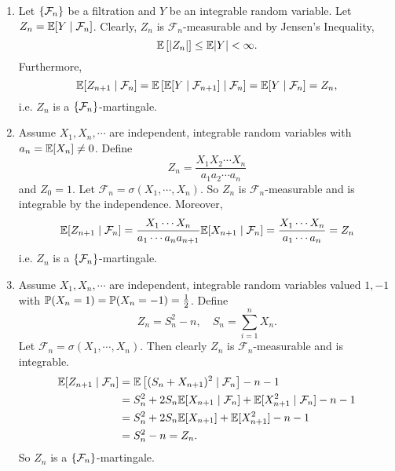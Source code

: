 \begin{exam}
    \begin{enumerate}[label=(\arabic{*})]
        \item Let $\left\{\mathcal{F}_n\right\}$ be a filtration and $Y$ be an integrable random variable. Let $Z_n = \mathbb{E}[Y \mid \mathcal{F}_n]$. Clearly, $Z_n$ is $\mathcal{F}_n$-measurable and by Jensen's Inequality,
        \begin{equation*}
            \mathbb{E}\left[\left\lvert Z_n\right\lvert\right] \leq \mathbb{E}{\left\lvert Y\right\lvert} < \infty.
        \end{equation*}
        Furthermore,
        \begin{equation*}
            \mathbb{E}[Z_{n+1} \mid \mathcal{F}_n] = \mathbb{E}\left[\mathbb{E}[Y \mid \mathcal{F}_{n+1}] \mid \mathcal{F}_n\right] = \mathbb{E}[Y \mid \mathcal{F}_n] = Z_n,
        \end{equation*}
        i.e. $Z_n$ is a $\left\{\mathcal{F}_n\right\}$-martingale.

        \item Assume $X_1,X_n,\cdots$ are independent, integrable random variables with $a_n = \mathbb{E}[X_n] \neq 0$. Define
        \begin{equation*}
            Z_n = \frac{X_1X_2\cdots X_n}{a_1a_2\cdots a_n}
        \end{equation*}
        and $Z_0 = 1$. Let $\mathcal{F}_n = \sigma(X_1,\cdots,X_n)$. So $Z_n$ is $\mathcal{F}_n$-measurable and is integrable by the independence. Moreover,
        \begin{equation*}
            \mathbb{E}[Z_{n+1} \mid \mathcal{F}_n] = \frac{X_1\cdots X_n}{a_1\cdots a_na_{n+1}}\mathbb{E}[X_{n+1} \mid \mathcal{F}_n] =  \frac{X_1\cdots X_n}{a_1\cdots a_n} =Z_n
        \end{equation*}
        i.e. $Z_n$ is a $\left\{\mathcal{F}_n\right\}$-martingale.

        \item Assume $X_1,X_n,\cdots$ are independent, integrable random variables valued $1,-1$ with $\mathbb{P}(X_n = 1) = \mathbb{P}(X_n = -1) = \frac{1}{2}$. Define
        \begin{equation*}
            Z_n = S_n^2 - n,\quad S_n = \sum_{i=1}^nX_n.
        \end{equation*}
        Let $\mathcal{F}_n = \sigma(X_1,\cdots,X_n)$. Then clearly $Z_n$ is $\mathcal{F}_n$-measurable and is integrable.
        \begin{equation*}
            \begin{aligned}
                \mathbb{E}[Z_{n+1} \mid \mathcal{F}_n] &= \mathbb{E}\left[ (S_n + X_{n+1})^2 \mid \mathcal{F}_n\right] - n - 1 \\
                &= S_n^2 + 2S_n\mathbb{E}[X_{n+1} \mid \mathcal{F}_n] + \mathbb{E}[X_{n+1}^2 \mid \mathcal{F}_n] - n - 1 \\
                &= S_n^2 + 2S_n\mathbb{E}[X_{n+1}] + \mathbb{E}[X_{n+1}^2] - n - 1\\
                &= S_n^2 - n = Z_n.
            \end{aligned}
        \end{equation*}
        So $Z_n$ is a $\left\{\mathcal{F}_n\right\}$-martingale.
    \end{enumerate}
\end{exam}

